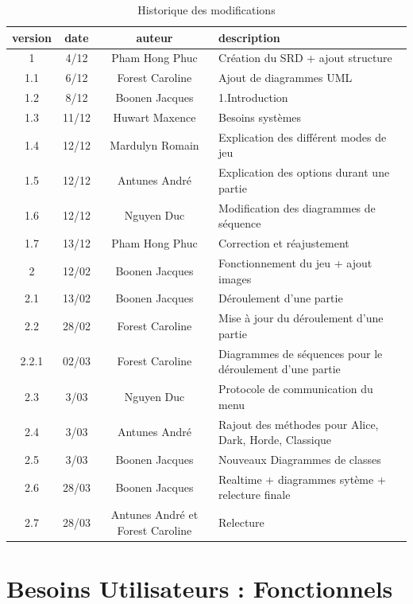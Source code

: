 \documentclass[10pt, a4paper]{article}
\begin{document}
		\begin{table}[h!]

			\centering

			\begin{tabular}{|c|c|c|p{50mm}|}
				\hline
				 \textbf{version} & \textbf{date} & \textbf{auteur}  & \textbf{description} \\ \hline
				 1 & 4/12 & Pham Hong Phuc & Création du SRD + ajout structure\\
				 1.1 & 6/12 & Forest Caroline & Ajout de diagrammes UML\\
				 1.2 & 8/12 & Boonen Jacques & 1.Introduction\\
				 1.3 & 11/12 & Huwart Maxence & Besoins systèmes\\
				 1.4 & 12/12 & Mardulyn Romain & Explication des différent modes de jeu\\
				 1.5 & 12/12 & Antunes André & Explication des options durant une partie\\
         1.6 & 12/12 & Nguyen Duc & Modification des diagrammes de séquence\\
         1.7 & 13/12 & Pham Hong Phuc & Correction et réajustement \\ \hline
				 2 & 12/02 & Boonen Jacques & Fonctionnement du jeu + ajout images \\
				 2.1 & 13/02 & Boonen Jacques & Déroulement d'une partie \\
				 2.2 & 28/02 & Forest Caroline & Mise à jour du déroulement d'une partie \\
				 2.2.1 & 02/03 & Forest Caroline & Diagrammes de séquences pour le déroulement d'une partie \\
				 2.3 & 3/03 & Nguyen Duc & Protocole de communication du menu \\
				 2.4 & 3/03 & Antunes André & Rajout des méthodes pour Alice, Dark, Horde, Classique \\
				 2.5 & 3/03 & Boonen Jacques & Nouveaux Diagrammes de classes \\
				 2.6 & 28/03 & Boonen Jacques & Realtime + diagrammes sytème + relecture finale \\
				 2.7 & 28/03 & Antunes André et Forest Caroline & Relecture \\
				\hline
\end{tabular}
			\caption*{Historique des modifications}
			\end{table}
\clearpage


\section{Besoins Utilisateurs : Fonctionnels}
\end{document}
